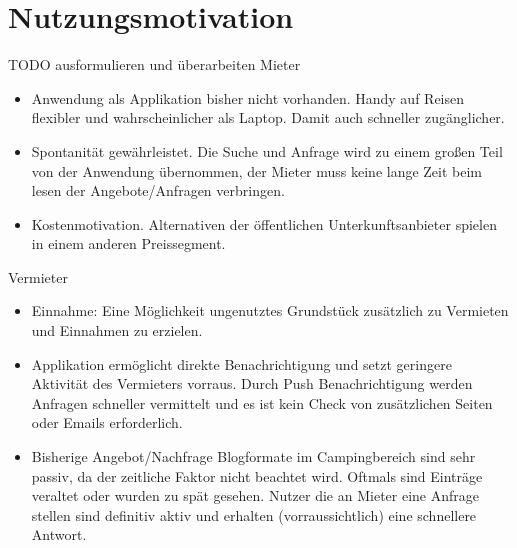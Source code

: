
\section{Nutzungsmotivation}
TODO ausformulieren und überarbeiten
Mieter
\begin{itemize}
   \item Anwendung als Applikation bisher nicht vorhanden. Handy auf Reisen flexibler und wahrscheinlicher als Laptop. Damit auch schneller zugänglicher.

   \item Spontanität gewährleistet. Die Suche und Anfrage wird zu einem großen Teil von der Anwendung übernommen, der Mieter muss keine lange Zeit beim lesen der Angebote/Anfragen verbringen.

   \item Kostenmotivation. Alternativen der öffentlichen Unterkunftsanbieter spielen in einem anderen Preissegment.

\end{itemize}

Vermieter
\begin{itemize}
   \item Einnahme: Eine Möglichkeit ungenutztes Grundstück zusätzlich zu Vermieten und Einnahmen zu erzielen.

   \item Applikation ermöglicht direkte Benachrichtigung und setzt geringere Aktivität des Vermieters vorraus. Durch Push Benachrichtigung werden Anfragen schneller vermittelt und es ist kein Check von zusätzlichen Seiten oder Emails erforderlich.
   
   \item Bisherige Angebot/Nachfrage Blogformate im Campingbereich sind sehr passiv, da der zeitliche Faktor nicht beachtet wird. Oftmals sind Einträge veraltet oder wurden zu spät gesehen. Nutzer die an Mieter eine Anfrage stellen sind definitiv aktiv und erhalten (vorraussichtlich) eine schnellere Antwort.

\end{itemize}

